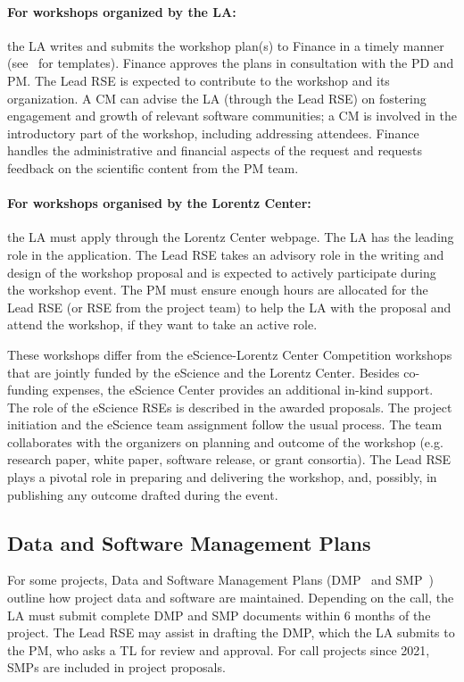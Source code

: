 \paragraph{For workshops organized by the LA:} the LA writes and submits the workshop plan(s) to Finance in a timely manner 
(see~\cite{proj-portfolio} for templates). Finance approves the plans in consultation with the PD and PM. 
The Lead RSE is expected to contribute to the workshop and its organization. A CM can advise the LA (through the Lead RSE) on
fostering engagement and growth of relevant software communities; a CM is involved in the introductory
part of the workshop, including addressing attendees. Finance handles the administrative and financial aspects of the 
request and requests feedback on the scientific content from the PM team.


%
\paragraph{For workshops organised by the Lorentz Center:} the LA must apply through the Lorentz Center webpage.
%
The LA has the leading role in the application. The Lead RSE takes an advisory role in the writing and design of the
workshop proposal and is expected to actively participate during the workshop event. The PM must ensure enough hours
are allocated for the Lead RSE (or RSE from the project team) to help the LA with the proposal and attend the workshop,
if they want to take an active role.

These workshops differ from the eScience-Lorentz Center Competition workshops that are jointly funded by the eScience and
the Lorentz Center. Besides co-funding expenses, the eScience Center provides an additional in-kind support. 
The role of the eScience RSEs is described in the awarded proposals. The project
initiation and the eScience team assignment follow the usual process. The team
collaborates with the organizers on planning and outcome of the workshop (e.g. research paper, white paper, software
release, or grant consortia). The Lead RSE plays a pivotal role in preparing and
delivering the workshop, and, possibly, in publishing any outcome drafted during the event. 

\subsection{Data and Software Management Plans}
\label{sec:exec:mp}
For some projects, Data and Software Management Plans (DMP~\cite{dmp-guide} and SMP~\cite{smp-guide}) outline how project data and software are maintained. 
%
Depending on the call, the LA must submit complete DMP and SMP documents within 6 months of the project. The Lead RSE 
may assist in drafting the DMP, which the LA submits to the PM, who asks a TL for review and approval. For call projects since 2021, SMPs are included in project proposals.

